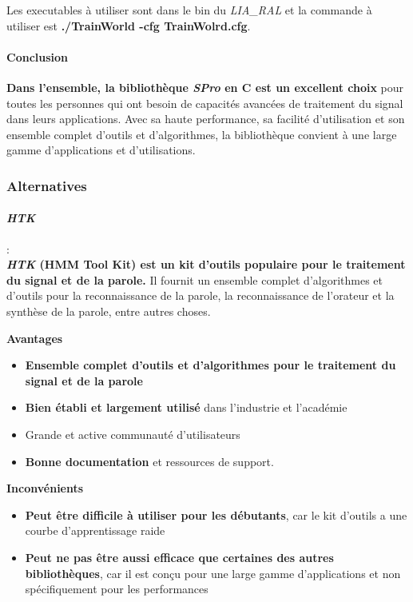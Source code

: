 Les executables à utiliser sont dans le bin du \textit{LIA\_RAL} et la commande à utiliser est \textbf{./TrainWorld -cfg TrainWolrd.cfg}.


\paragraph*{Conclusion}
\textbf{Dans l'ensemble, la bibliothèque \textit{SPro} en C est un excellent choix} pour toutes les personnes qui ont besoin de capacités avancées de traitement du signal dans leurs applications.
Avec sa haute performance, sa facilité d'utilisation et son ensemble complet d'outils et d'algorithmes, la bibliothèque convient à une large gamme d'applications et d'utilisations.

\subsubsection*{Alternatives}

\paragraph*{\textbf{\textit{HTK}}}: \\
\textbf{\textit{HTK} (HMM Tool Kit) est un kit d'outils populaire pour le traitement du signal et de la parole.} Il fournit un ensemble complet d'algorithmes et d'outils
pour la reconnaissance de la parole, la reconnaissance de l'orateur et la synthèse de la parole, entre autres choses.

\textbf{Avantages}
\begin{itemize}
    \item \textbf{Ensemble complet d'outils et d'algorithmes pour le traitement du signal et de la parole}
    \item \textbf{Bien établi et largement utilisé} dans l'industrie et l'académie
    \item Grande et active communauté d'utilisateurs
    \item \textbf{Bonne documentation} et ressources de support.
\end{itemize}


\textbf{Inconvénients}
\begin{itemize}
    \item \textbf{Peut être difficile à utiliser pour les débutants}, car le kit d'outils a une courbe d'apprentissage raide
    \item \textbf{Peut ne pas être aussi efficace que certaines des autres bibliothèques}, car il est conçu pour une large gamme
          d'applications et non spécifiquement pour les performances
\end{itemize}

